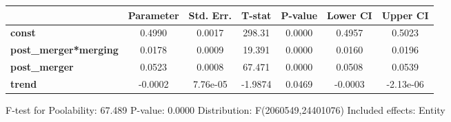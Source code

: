 \documentclass{report}a
\begin{document}
\begin{center}
\begin{tabular}{lcccccc}
                              & \textbf{Parameter} & \textbf{Std. Err.} & \textbf{T-stat} & \textbf{P-value} & \textbf{Lower CI} & \textbf{Upper CI}  \\
\midrule
\textbf{const}                &       0.4990       &       0.0017       &      298.31     &      0.0000      &       0.4957      &       0.5023       \\
\textbf{post\_merger*merging} &       0.0178       &       0.0009       &      19.391     &      0.0000      &       0.0160      &       0.0196       \\
\textbf{post\_merger}         &       0.0523       &       0.0008       &      67.471     &      0.0000      &       0.0508      &       0.0539       \\
\textbf{trend}                &      -0.0002       &      7.76e-05      &     -1.9874     &      0.0469      &      -0.0003      &     -2.13e-06      \\
\bottomrule
\end{tabular}
\end{center}

F-test for Poolability: 67.489 \newline
 P-value: 0.0000 \newline
 Distribution: F(2060549,24401076) \newline
  \newline
 Included effects: Entity
\end{document}
